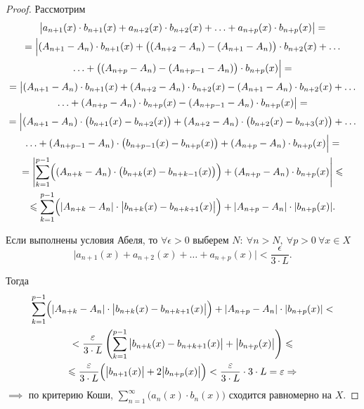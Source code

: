 \begin{proof}
    Рассмотрим
    \begin{multline*}
        \big|a_{n+1}(x)\cdot b_{n+1}(x) + a_{n+2}(x)\cdot b_{n+2}(x) + \ldots + a_{n+p}(x)\cdot b_{n+p}(x)\big| = \\
        = \Big|(A_{n+1} - A_n)\cdot b_{n+1}(x) + \big((A_{n+2} - A_n) - (A_{n+1} - A_n)\big)\cdot b_{n+2}(x) + \ldots \\
        \ldots + \big((A_{n+p} -A_n) - (A_{n+p-1} - A_n)\big)\cdot b_{n+p}(x)\Big| = \\
        = \big|(A_{n+1} - A_n)\cdot b_{n+1}(x) + (A_{n+2} - A_n)\cdot b_{n+2}(x) - (A_{n+1} - A_n)\cdot b_{n+2}(x) + \ldots \\
        \ldots + (A_{n+p} -A_n)\cdot b_{n+p}(x) - (A_{n+p-1} - A_n)\cdot b_{n+p}(x)\big| = \\
        = \Big|(A_{n+1}-A_n)\cdot\big(b_{n+1}(x)-b_{n+2}(x)\big) + (A_{n+2}-A_n)\cdot\big(b_{n+2}(x)-b_{n+3}(x)\big) + \ldots \\
        \ldots + (A_{n+p-1}-A_n)\cdot\big(b_{n+p-1}(x)-b_{n+p}(x)\big) + (A_{n+p} - A_n)\cdot b_{n+p}(x)\Big| = \\
        = \left|\sum_{k=1}^{p-1}\Bigl((A_{n+k} - A_n)\cdot\big(b_{n+k}(x) - b_{n+k-1}(x)\big)\Bigr) + (A_{n+p} - A_n)\cdot b_{n+p}(x) \right| \leqslant \\
        \leqslant \sum_{k=1}^{p-1}\Bigl(|A_{n+k} - A_n| \cdot \big|b_{n+k}(x) - b_{n+k+1}(x)\big|\Bigr) + | A_{n+p} - A_n | \cdot | b_{n+p}(x) |.
    \end{multline*}

    Если выполнены условия Абеля, то $ \forall \epsilon > 0 $ выберем $ N: \ \forall n > N, \ \forall p > 0 \ \forall x \in X $
    \[
        \big|a_{n+1}(x) + a_{n+2}(x) + \ldots + a_{n+p}(x)\big| < \frac{\epsilon}{3\cdot L}.
    \]

    Тогда
    \begin{multline*}
        \sum_{k=1}^{p-1}\Bigl(|A_{n+k} - A_n| \cdot \big|b_{n+k}(x) - b_{n+k+1}(x)\big|\Bigr) + | A_{n+p} - A_n | \cdot | b_{n+p}(x) | < \\
        < \frac{\epsilon}{3\cdot L}\left(\sum_{k=1}^{p-1}\big|b_{n+k}(x) - b_{n+k+1}(x)\big| + \big|b_{n+p}(x)\big|\right) \leqslant \\
        \leqslant \frac{\epsilon}{3\cdot L}\Bigl(\big|b_{n+1}(x)\big| + 2\big|b_{n+p}(x)\big|\Bigr) < \frac{\epsilon}{3\cdot L} \cdot 3\cdot L = \epsilon \implies
    \end{multline*}
    $ \implies $ по критерию Коши, $ \sum_{n=1}^{\infty}\big(a_n(x)\cdot b_n(x)\big) $ сходится равномерно на $ X $.
\end{proof}

